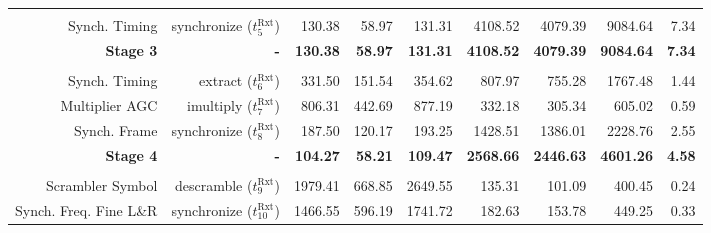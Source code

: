 \begin{table}[htp]
{{\begin{tabular}{r | r | r r r | r r r | r}
                                  &                                    &                  &                   &                   &                   &                   &                   &                \\
                   Synch. Timing  &  synchronize ($t^\text{Rxt}_{5}$)  &          130.38  &            58.97  &           131.31  &          4108.52  &          4079.39  &          9084.64  &          7.34  \\ \hline
                 \textbf{Stage 3} &                         \textbf{-} &  \textbf{130.38} &    \textbf{58.97} &   \textbf{131.31} &  \textbf{4108.52} &  \textbf{4079.39} &  \textbf{9084.64} &  \textbf{7.34} \\ %
                                  &                                    &                  &                   &                   &                   &                   &                   &                \\
                    Synch. Timing &      extract ($t^\text{Rxt}_{6}$)  &          331.50  &           151.54  &           354.62  &           807.97  &           755.28  &          1767.48  &          1.44  \\
                   Multiplier AGC &    imultiply ($t^\text{Rxt}_{7}$)  &          806.31  &           442.69  &           877.19  &           332.18  &           305.34  &           605.02  &          0.59  \\
                     Synch. Frame &  synchronize ($t^\text{Rxt}_{8}$)  &          187.50  &           120.17  &           193.25  &          1428.51  &          1386.01  &          2228.76  &          2.55  \\ \hline
                 \textbf{Stage 4} &                         \textbf{-} &  \textbf{104.27} &    \textbf{58.21} &   \textbf{109.47} &  \textbf{2568.66} &  \textbf{2446.63} &  \textbf{4601.26} &  \textbf{4.58} \\ %
                                  &                                    &                  &                   &                   &                   &                   &                   &                \\
                 Scrambler Symbol &   descramble ($t^\text{Rxt}_{9}$)  &         1979.41  &           668.85  &          2649.55  &           135.31  &           101.09  &           400.45  &          0.24  \\
           Synch. Freq. Fine L\&R &  synchronize ($t^\text{Rxt}_{10}$) &         1466.55  &           596.19  &          1741.72  &           182.63  &           153.78  &           449.25  &          0.33  \\

\end{tabular}}}
\end{table}
